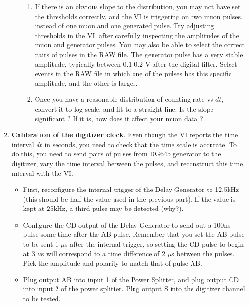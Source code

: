 \documentclass{../lab}
\begin{document}
\begin{enumerate}
\begin{itemize}
\begin{enumerate}
            \item If there is an obvious slope to the distribution, you may not have set the thresholds correctly, and the VI is triggering on two muon pulses, instead of one muon and one generated pulse. Try adjusting thresholds in the VI, after carefully inspecting the amplitudes of the muon and generator pulses. You may also be able to select the correct pairs of pulses in the RAW file. The generator pulse has a very stable amplitude, typically between 0.1-0.2 V after the digital filter. Select events in the RAW file in which one of the pulses has this specific amplitude, and the other is larger.
    
            \item Once you have a reasonable distribution of counting rate vs $dt$, convert it to log scale, and fit to a straight line. Is the slope significant ? If it is, how does it affect your muon data ?
        \end{enumerate}

    \end{itemize}

    \item \textbf{Calibration of the digitizer clock}. Even though the VI reports the time interval $dt$ in seconds, you need to check that the time scale is accurate. To do this, you need to send pairs of pulses from DG645 generator to the digitizer, vary the time interval between the pulses, and reconstruct this time interval with the VI.

\newpage

    \begin{itemize}
        \item First, reconfigure the internal trigger of the Delay Generator to 12.5kHz (this should be half the value used in the previous part). If the value is kept at 25kHz, a third pulse may be detected (why?).

        \item Configure the CD output of the Delay Generator to send out a 100ns pulse some time after the AB pulse. Remember that you set the AB pulse to be sent 1 $\mu$s after the internal trigger, so setting the CD pulse to begin at 3 $\mu$s will correspond to a time difference of 2 $\mu$s between the pulses. Pick the amplitude and polarity to match that of pulse AB.

        \item Plug output AB into input 1 of the Power Splitter, and plug output CD into input 2 of the power splitter. Plug output S into the digitizer channel to be tested.


\end{itemize}
\end{enumerate}
\end{document}

